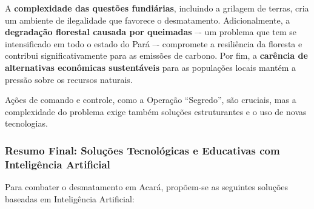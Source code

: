\documentclass[12pt, a4paper, onecolumn, notitlepage]{article}
\begin{document}
    A \textbf{complexidade das questões fundiárias}, incluindo a grilagem de terras, cria um ambiente de ilegalidade que favorece o desmatamento. Adicionalmente, a \textbf{degradação florestal causada por queimadas}  –- um problema que tem se intensificado em todo o estado do Pará  –- compromete a resiliência da floresta e contribui significativamente para as emissões de carbono. Por fim, a \textbf{carência de alternativas econômicas sustentáveis} para as populações locais mantém a pressão sobre os recursos naturais.

    Ações de comando e controle, como a Operação ``Segredo'', são cruciais, mas a complexidade do problema exige também soluções estruturantes e o uso de novas tecnologias.

    \subsubsection*{Resumo Final: Soluções Tecnológicas e Educativas com Inteligência Artificial}
    Para combater o desmatamento em Acará, propõem-se as seguintes soluções baseadas em Inteligência Artificial:
\end{document}
